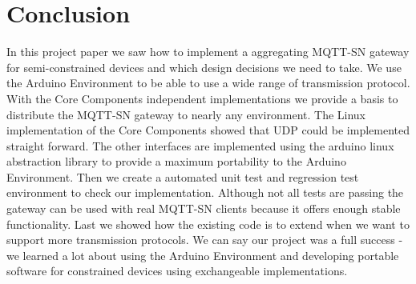 \section{Conclusion}
In this project paper we saw how to implement a aggregating MQTT-SN gateway for semi-constrained devices and which design decisions we need to take.
We use the Arduino Environment to be able to use a wide range of transmission protocol.
With the Core Components independent implementations we provide a basis to distribute the MQTT-SN gateway to nearly any environment.
The Linux implementation of the Core Components showed that UDP could be implemented straight forward.
The other interfaces are implemented using the arduino linux abstraction library to provide a maximum portability to the Arduino Environment.
Then we create a automated unit test and regression test environment to check our implementation.
Although not all tests are passing the gateway can be used with real MQTT-SN clients because it offers enough stable functionality.
Last we showed how the existing code is to extend when we want to support more transmission protocols.
We can say our project was a full success - we learned a lot about using the Arduino Environment and developing portable software for constrained devices using exchangeable implementations.